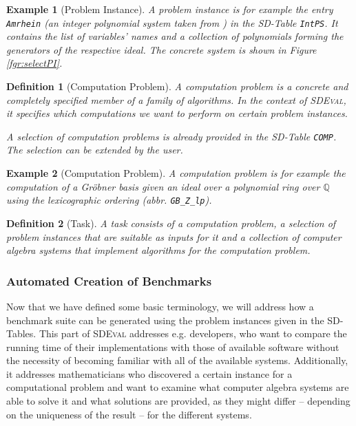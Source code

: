 \documentclass[12pt]{article}
\newtheorem{example}{Example}
\newtheorem{definition}{Definition}
\begin{document}
\begin{example}[Problem Instance]
  A problem instance is for example the entry \texttt{Amrhein} (an integer
  polynomial system taken from \cite{amrhein1996walking}) in the SD-Table
  \texttt{IntPS}. It contains the list of variables' names and a collection of
  polynomials forming the generators of the respective ideal. The concrete
  system is shown in Figure \ref{fgr:selectPI}.
\end{example}

\begin{definition}[Computation Problem]
  \label{def:ComputationProblem}
   A computation problem is a concrete and
  completely specified member of a family of algorithms.  In the context of
  \textsc{SDEval}, it specifies which computations we want to perform on
  certain problem instances.

  A selection of computation problems is already provided in the SD-Table
  \texttt{COMP}. The selection can be extended by the user.
\end{definition}

\begin{example}[Computation Problem]
 A computation problem is for example the computation of a Gr\"obner basis
 given an ideal over a polynomial ring over $\mathbb{Q}$ using the
 lexicographic ordering (abbr. \texttt{GB\_Z\_lp}).
\end{example}

\begin{definition}[Task]
  \label{def:Task}
   A task consists of a computation problem, a selection of problem
  instances that are suitable as inputs for it and a collection of computer
  algebra systems that implement algorithms for the computation problem.
\end{definition}

\subsubsection{Automated Creation of Benchmarks}

Now that we have defined some basic terminology, we will address how a
benchmark suite can be generated using the problem instances given in the
SD-Tables. This part of \textsc{SDEval} addresses e.g. developers, who want to
compare the running time of their implementations with those of available
software without the necessity of becoming familiar with all of the available
systems.  Additionally, it addresses mathematicians who discovered a certain
instance for a computational problem and want to examine what computer algebra
systems are able to solve it and what solutions are provided, as they might
differ -- depending on the uniqueness of the result -- for the different
systems.
\end{document}
